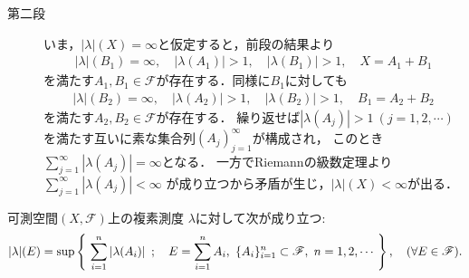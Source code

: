 \begin{prf}
\begin{description}
		\item[第二段]
			いま，$|\lambda|(X) = \infty$と仮定すると，前段の結果より
			\begin{align}
				|\lambda|(B_1) = \infty, \quad |\lambda(A_1)| > 1, \quad |\lambda(B_1)| > 1,
				\quad X = A_1 + B_1
			\end{align}
			を満たす$A_1,B_1 \in \mathscr{F}$が存在する．同様に$B_1$に対しても
			\begin{align}
				|\lambda|(B_2) = \infty, \quad |\lambda(A_2)| > 1, \quad |\lambda(B_2)| > 1,
				\quad B_1 = A_2 + B_2
			\end{align}
			を満たす$A_2,B_2 \in \mathscr{F}$が存在する．
			繰り返せば$|\lambda(A_j)| > 1\ (j=1,2,\cdots)$
			を満たす互いに素な集合列$(A_j)_{j=1}^{\infty}$が構成され，
			このとき$\sum_{j=1}^{\infty} |\lambda(A_j)| = \infty$となる．
			一方でRiemannの級数定理より$\sum_{j=1}^{\infty} |\lambda(A_j)| < \infty$
			が成り立つから矛盾が生じ，$|\lambda|(X) < \infty$が出る．
			\QED
		\end{description}
	\end{prf}
	
	\begin{screen}
		\begin{thm}[総変動測度は有限分割で表現できる]\label{thm:complex_measure_finite_splits}
			可測空間$(X,\mathscr{F})$上の複素測度
			$\lambda$に対して次が成り立つ:
			\begin{align}
				|\lambda|(E)
				= \operatorname*{sup}_{} \left\{\ \sum_{i=1}^n|\lambda(A_i)|\ \, ; \quad E=\sum_{i=1}^n A_i,
				\ \{A_i\}_{i=1}^n \subset \mathscr{F},\ n=1,2,\cdots\ \right\},
				\quad (\forall E \in \mathscr{F}).
			\end{align}
		\end{thm}
	\end{screen}
	
